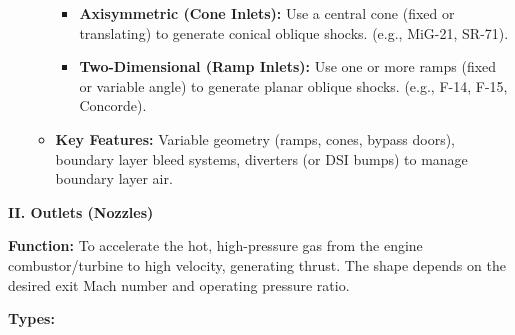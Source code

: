 \begin{enumerate}
\begin{itemize}
    \begin{itemize}
    \tightlist
    \item
      \textbf{Axisymmetric (Cone Inlets):} Use a central cone (fixed or
      translating) to generate conical oblique shocks. (e.g., MiG-21,
      SR-71).
    \item
      \textbf{Two-Dimensional (Ramp Inlets):} Use one or more ramps
      (fixed or variable angle) to generate planar oblique shocks.
      (e.g., F-14, F-15, Concorde).
    \end{itemize}
  \item
    \textbf{Key Features:} Variable geometry (ramps, cones, bypass
    doors), boundary layer bleed systems, diverters (or DSI bumps) to
    manage boundary layer air.
  \end{itemize}
\end{enumerate}

\textbf{II. Outlets (Nozzles)}

\textbf{Function:} To accelerate the hot, high-pressure gas from the
engine combustor/turbine to high velocity, generating thrust. The shape
depends on the desired exit Mach number and operating pressure ratio.

\textbf{Types:}

